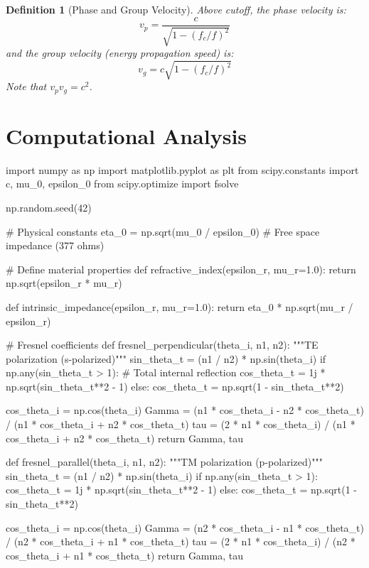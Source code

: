 \documentclass[a4paper, 11pt]{article}
\newtheorem{definition}{Definition}[section]
\begin{document}
\begin{definition}[Phase and Group Velocity]
Above cutoff, the phase velocity is:
\begin{equation}
v_p = \frac{c}{\sqrt{1 - (f_c/f)^2}}
\end{equation}
and the group velocity (energy propagation speed) is:
\begin{equation}
v_g = c\sqrt{1 - (f_c/f)^2}
\end{equation}
Note that $v_p v_g = c^2$.
\end{definition}

\section{Computational Analysis}

\begin{pycode}
import numpy as np
import matplotlib.pyplot as plt
from scipy.constants import c, mu_0, epsilon_0
from scipy.optimize import fsolve

np.random.seed(42)

# Physical constants
eta_0 = np.sqrt(mu_0 / epsilon_0)  # Free space impedance (377 ohms)

# Define material properties
def refractive_index(epsilon_r, mu_r=1.0):
    return np.sqrt(epsilon_r * mu_r)

def intrinsic_impedance(epsilon_r, mu_r=1.0):
    return eta_0 * np.sqrt(mu_r / epsilon_r)

# Fresnel coefficients
def fresnel_perpendicular(theta_i, n1, n2):
    """TE polarization (s-polarized)"""
    sin_theta_t = (n1 / n2) * np.sin(theta_i)
    if np.any(sin_theta_t > 1):
        # Total internal reflection
        cos_theta_t = 1j * np.sqrt(sin_theta_t**2 - 1)
    else:
        cos_theta_t = np.sqrt(1 - sin_theta_t**2)

    cos_theta_i = np.cos(theta_i)
    Gamma = (n1 * cos_theta_i - n2 * cos_theta_t) / (n1 * cos_theta_i + n2 * cos_theta_t)
    tau = (2 * n1 * cos_theta_i) / (n1 * cos_theta_i + n2 * cos_theta_t)
    return Gamma, tau

def fresnel_parallel(theta_i, n1, n2):
    """TM polarization (p-polarized)"""
    sin_theta_t = (n1 / n2) * np.sin(theta_i)
    if np.any(sin_theta_t > 1):
        cos_theta_t = 1j * np.sqrt(sin_theta_t**2 - 1)
    else:
        cos_theta_t = np.sqrt(1 - sin_theta_t**2)

    cos_theta_i = np.cos(theta_i)
    Gamma = (n2 * cos_theta_i - n1 * cos_theta_t) / (n2 * cos_theta_i + n1 * cos_theta_t)
    tau = (2 * n1 * cos_theta_i) / (n2 * cos_theta_i + n1 * cos_theta_t)
    return Gamma, tau


\end{pycode}
\end{document}
